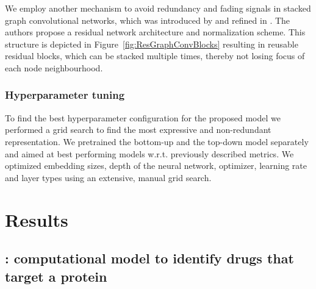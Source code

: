 \documentclass{bioinfo}
\begin{document}
We employ another mechanism to avoid redundancy and fading signals in
stacked graph convolutional networks, which was introduced by
\citet{DeepGCN2019} and refined in \citet{DeeperGCN2020}. The authors
propose a residual network architecture and normalization scheme. This
structure is depicted in Figure~\ref{fig:ResGraphConvBlocks} resulting
in reusable residual blocks, which can be stacked multiple times,
thereby not losing focus of each node neighbourhood.



\subsubsection{Hyperparameter tuning}
To find the best hyperparameter configuration for the proposed model
we performed a grid search to find the most expressive and
non-redundant representation. We pretrained the bottom-up and the
top-down model separately and aimed at best performing models
w.r.t. previously described metrics. We optimized embedding sizes,
depth of the neural network, optimizer, learning rate and layer types
using an extensive, manual grid search. 


\section{Results}

\subsection{\name: computational model to identify drugs that target a
  protein}


\end{document}
